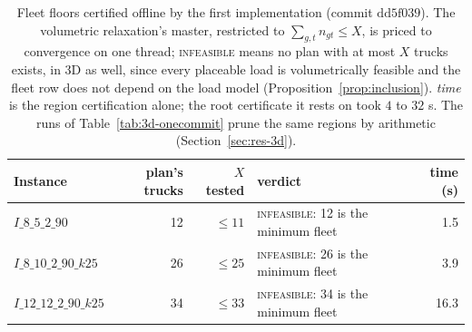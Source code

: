 \begin{table}[!htbp]
\centering
\small
\caption{Fleet floors certified offline by the first implementation
(commit $\mathrm{dd}5\mathrm{f}039$). The volumetric relaxation's
master, restricted to $\sum_{g,t}n_{gt}\le X$, is priced to convergence
on one thread; \textsc{infeasible} means no plan with at most $X$ trucks
exists, in 3D as well, since every placeable load is volumetrically
feasible and the fleet row does not depend on the load model
(Proposition~\ref{prop:inclusion}). \emph{time} is the region
certification alone; the root certificate it rests on took $4$ to
$32$ s. The runs of Table~\ref{tab:3d-onecommit} prune the same
regions by arithmetic (Section~\ref{sec:res-3d}).}
\label{tab:fleetfloor}
\begin{tabular}{lrrlr}
\toprule
Instance & plan's trucks & $X$ tested & verdict & time (s) \\
\midrule
$I\_8\_5\_2\_90$        & 12 & $\le11$ & \textsc{infeasible}: 12 is the minimum fleet & 1.5 \\
$I\_8\_10\_2\_90\_k25$  & 26 & $\le25$ & \textsc{infeasible}: 26 is the minimum fleet & 3.9 \\
$I\_12\_12\_2\_90\_k25$ & 34 & $\le33$ & \textsc{infeasible}: 34 is the minimum fleet & 16.3 \\
\bottomrule
\end{tabular}
\end{table}

